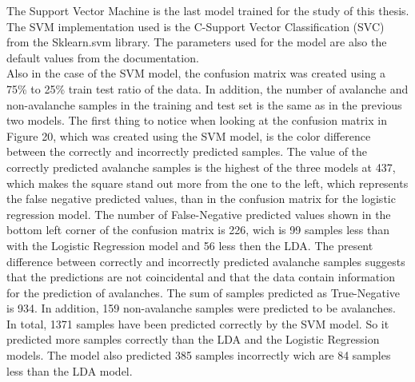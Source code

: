 \documentclass[../masterarbeit.tex]{subfiles}
\begin{document}
The Support Vector Machine is the last model trained for the study of this thesis. The SVM implementation used is the C-Support Vector Classification (SVC) \textcite[]{Scikit-learn-svc:2022} from the Sklearn.svm library. The parameters used for the model are also the default values from the documentation. \\
Also in the case of the SVM model, the confusion matrix was created using a 75\% to 25\% train test ratio of the data. In addition, the number of avalanche and non-avalanche samples in the training and test set is the same as in the previous two models. The first thing to notice when looking at the confusion matrix in Figure 20, which was created using the SVM model, is the color difference between the correctly and incorrectly predicted samples. The value of the correctly predicted avalanche samples is the highest of the three models at 437, which makes the square stand out more from the one to the left, which represents the false negative predicted values, than in the confusion matrix for the logistic regression model. The number of False-Negative predicted values shown in the bottom left corner of the confusion matrix is 226, wich is 99 samples less than with the Logistic Regression model and 56 less then the LDA. The present difference between correctly and incorrectly predicted avalanche samples suggests that the predictions are not coincidental and that the data contain information for the prediction of avalanches. The sum of samples predicted as True-Negative is 934. In addition, 159 non-avalanche samples were predicted to be avalanches. In total, 1371 samples have been predicted correctly by the SVM model. So it predicted more samples correctly than the LDA and the Logistic Regression models. The model also predicted 385 samples incorrectly wich are 84 samples less than the LDA model. \\~\\
\end{document}
